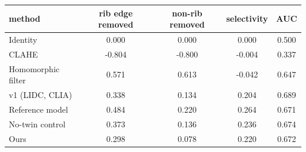 \begin{tabular}{lcccc}
\toprule
method & rib edge removed & non-rib removed & selectivity & AUC \\
\midrule
Identity & 0.000 & 0.000 & 0.000 & 0.500 \\
CLAHE & -0.804 & -0.800 & -0.004 & 0.337 \\
Homomorphic filter & 0.571 & 0.613 & -0.042 & 0.647 \\
v1 (LIDC, CLIA) & 0.338 & 0.134 & 0.204 & 0.689 \\
Reference model & 0.484 & 0.220 & 0.264 & 0.671 \\
No-twin control & 0.373 & 0.136 & 0.236 & 0.674 \\
Ours & 0.298 & 0.078 & 0.220 & 0.672 \\
\bottomrule
\end{tabular}
